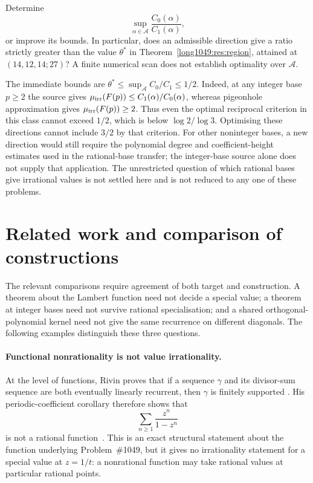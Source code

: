 \documentclass[11pt]{article}
\begin{document}
\begin{problem}
Determine
\[
 \sup_{\alpha\in\mathcal A}\frac{C_0(\alpha)}{C_1(\alpha)},
\]
or improve its bounds. In particular, does an admissible direction give
a ratio strictly greater than the value $\theta^*$ in
Theorem~\ref{long1049:res:region}, attained at $(14,12,14;27)$?
A finite numerical scan does not establish optimality over $\mathcal A$.
\end{problem}

The immediate bounds are $\theta^*\le\sup_{\mathcal A}C_0/C_1\le1/2$.
Indeed, at any integer base $p\ge2$ the source gives
$\mu_{\rm irr}(F(p))\le C_1(\alpha)/C_0(\alpha)$, whereas pigeonhole
approximation gives $\mu_{\rm irr}(F(p))\ge2$.
Thus even the optimal reciprocal criterion in this class cannot exceed
$1/2$, which is below $\log2/\log3$. Optimising these directions cannot
include $3/2$ by that criterion. For other noninteger bases, a new
direction would still require the polynomial degree and coefficient-height
estimates used in the rational-base transfer; the integer-base source
alone does not supply that application.
The unrestricted question of which rational bases give irrational values
is not settled here and is not reduced to any one of these problems.

\section*{Related work and comparison of constructions}
The relevant comparisons require agreement of both target and
construction. A theorem about the Lambert function need not decide
a special value; a theorem at integer bases need not survive
rational specialisation; and a shared orthogonal-polynomial kernel
need not give the same recurrence on different diagonals.
The following examples distinguish these three questions.

\paragraph{Functional nonrationality is not value irrationality.}
At the level of functions, Rivin proves that if a sequence \(\gamma\) and its
divisor-sum sequence are both eventually linearly recurrent, then \(\gamma\)
is finitely supported
\cite[Theorem~1.1, p.~2; proof pp.~6--7]{rivin2026}.
His periodic-coefficient corollary therefore shows that
\[
  \sum_{n\ge1}\frac{z^n}{1-z^n}
\]
is not a rational function~\cite[Corollary~6.4, p.~9]{rivin2026}.
This is an exact structural statement about the function underlying
Problem~\#1049, but it gives no irrationality statement for a special value
at \(z=1/t\): a nonrational function may take rational values at particular
rational points.
\end{document}
